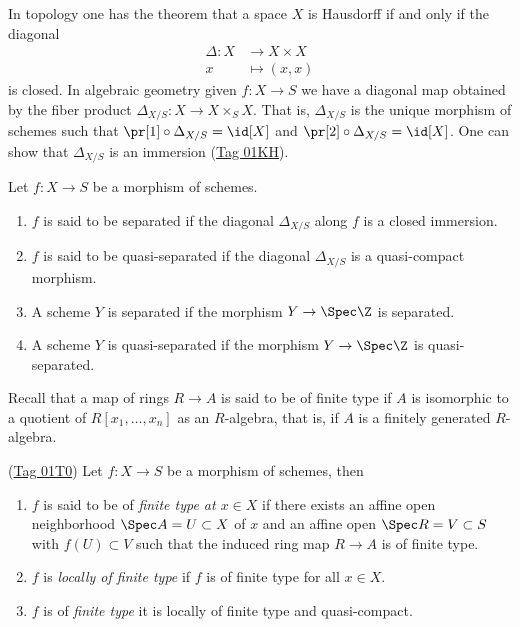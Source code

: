 \documentclass[12pt]{article}
\numberwithin{equation}{section}
\numberwithin{lemma}{section}
\numberwithin{theorem}{section}
\numberwithin{proposition}{section}
\numberwithin{corollary}{section}
\numberwithin{definition}{section}
\numberwithin{example}{section}
\numberwithin{remark}{section}
\begin{document}
In topology one has the theorem that a space $X$ is Hausdorff if and
only if the diagonal
\begin{align*}
  \Delta : X &\to X \times X \\
  x &\mapsto (x, x)
\end{align*}
is closed. In algebraic geometry given $f : X \to S$ we have a
diagonal map obtained by the fiber product
$\Delta_{X/S} : X \to X \times_{S} X$. That is, $\Delta_{X/S}$ is the
unique morphism of schemes such that
$\pr[1] \circ \Delta_{X/S} = \id[X]$ and
$\pr[2] \circ \Delta_{X/S} = \id[X]$. One can show that $\Delta_{X/S}$
is an immersion (\href{https://stacks.math.columbia.edu/tag/01KH}{Tag
  01KH}).

\begin{definition}
  Let $f : X \to S$ be a morphism of schemes.
  \begin{enumerate}[label=(\arabic*)]
  \item $f$ is said to be separated if the diagonal $\Delta_{X/S}$
    along $f$ is a closed immersion.
  \item $f$ is said to be quasi-separated if the diagonal
    $\Delta_{X/S}$ is a quasi-compact morphism.
  \item A scheme $Y$ is separated if the morphism $Y \to \Spec \Z$ is separated.
  \item A scheme $Y$ is quasi-separated if the morphism
    $Y \to \Spec \Z$ is quasi-separated.
  \end{enumerate}
\end{definition}

Recall that a map of rings $R \to A$ is said to be of finite type if
$A$ is isomorphic to a quotient of $R[x_1, \dots, x_n]$ as an
$R$-algebra, that is, if $A$ is a finitely generated $R$-algebra.

\begin{definition}{(\href{https://stacks.math.columbia.edu/tag/01T0}{Tag 01T0})}
  Let $f : X \to S$ be a morphism of schemes, then
  \begin{enumerate}[label=(\arabic*)]
  \item $f$ is said to be of \emph{finite type at $x \in X$} if there
    exists an affine open neighborhood $\Spec A = U \subset X$ of $x$
    and an affine open $\Spec R = V \subset S$ with $f(U) \subset V$ such that the induced ring map $R \to A$ is of finite type.
  \item $f$ is \emph{locally of finite type} if $f$ is of finite type
    for all $x \in X$.
  \item $f$ is of \emph{finite type} it is locally of finite type and
    quasi-compact.
  \end{enumerate}
\end{definition}
\end{document}
